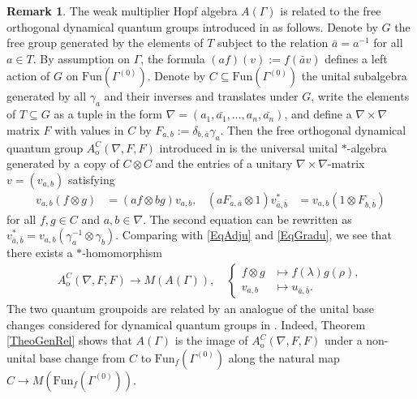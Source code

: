 \documentclass[10pt]{article}
\newcommand{\Fun}{\mathrm{Fun}}
\theoremstyle{definition}
\newtheorem{Rem}[Theorem]{Remark}
\numberwithin{equation}{section}
\begin{document}
\begin{Rem}
  The weak multiplier Hopf algebra $A(\Gamma)$ is related to the free
  orthogonal dynamical quantum groups introduced in
  \cite{timmermann:free} as follows.  Denote by $G$ the free group
  generated by the elements of $T$ subject to the relation
  $\bar{a}=a^{-1}$ for all $a\in T$. By assumption on $\Gamma$, the
  formula $(af)(v):=f(\bar{a}v)$ defines a left action of $G$ on
  $\Fun(\Gamma^{(0)})$. Denote by $C\subseteq \Fun(\Gamma^{(0)})$ the
  unital subalgebra generated by all $\gamma_{a}$ and their inverses
  and translates under $G$,  write the
  elements of $T \subseteq G$ as a tuple in the form
  $\nabla=(a_{1},\bar{a_{1}},\ldots,a_{n},\bar{a_{n}})$, and define a
  $\nabla\times\nabla$ matrix $F$ with values in $C$ by $F_{a,b} :=
  \delta_{b,\bar{a}} \gamma_{a}$.  Then the free orthogonal dynamical
  quantum group $A_{\mathrm{o}}^{C}(\nabla,F,F)$ introduced in
  \cite{timmermann:free} is the universal unital $*$-algebra generated
  by a copy of $C\otimes C$ and the entries of a unitary $\nabla\times\nabla$-matrix
  $v=(v_{a,b})$ satisfying
  \begin{align*}
    v_{a,b}(f \otimes g) &= (af\otimes bg) v_{a,b}, &
    (aF_{a,\bar{a}}\otimes 1)v_{\bar{a},\bar{b}}^{*} &=
    v_{a,b}(1\otimes F_{b,\bar{b}})
  \end{align*}
  for all $f,g\in C$ and $a,b\in \nabla$. The second equation
  can be rewritten as
  $v_{\bar{a},\bar{b}}^{*}=v_{a,b}(\gamma_{a}^{-1} \otimes
  \gamma_{b})$.   Comparing with
  \eqref{EqAdju} and \eqref{EqGradu}, we see that there exists a
  $*$-homomorphism
  \begin{align*}
  A^{C}_{\mathrm{o}}(\nabla,F,F)  \to
  M(A(\Gamma)), \quad
  \begin{cases}
    f\otimes g&
\mapsto f(\lambda)g(\rho), \\
    v_{a,b} &\mapsto u_{\bar{a},\bar{b}}.
  \end{cases}
\end{align*}
 The two quantum groupoids are related by an
analogue of the unital base changes considered for dynamical quantum
groups in \cite[Proposition 2.1.12]{timmermann:free}. Indeed, Theorem
\ref{TheoGenRel} shows that $A(\Gamma)$ is the image of
$A^{C}_{\mathrm{o}}(\nabla,F,F)$ under a non-unital base change from
$C$ to $\Fun_{f}(\Gamma^{(0)})$ along the natural map $C \to
M(\Fun_{f}(\Gamma^{(0)}))$.

\end{Rem}
\end{document}
